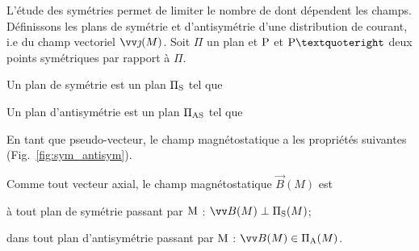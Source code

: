 \documentclass[12pt,fancy]{cours}
\begin{document}

 L'étude des symétries permet de limiter le nombre de  dont dépendent les champs. Définissons les plans de symétrie et d’antisymétrie d’une distribution de courant, i.e du champ vectoriel $\j(M)$.  Soit $\Pi$ un plan et $\rm P$ et $\rm P’$ deux points symétriques par rapport à $\Pi$.
\begin{liste}
  \item Un plan de symétrie est un plan $\Pi_{\rm S}$ tel que 
  \item Un plan d’antisymétrie est un plan $\Pi_{\rm AS}$ tel que

\end{liste}
 En tant que pseudo-vecteur, le champ magnétostatique a les propriétés suivantes (Fig.~\ref{fig:sym_antisym}).

\begin{prop}\label{prop:}
Comme tout vecteur axial, le champ magnétostatique $\Vec{B}(M)$ est 
 \begin{liste}
  \item {} à tout plan de symétrie passant par $\rm M$ : $\Vec{B}(M) \perp \Pi_{\rm S}(M)$;
  \item {} dans tout plan d'antisymétrie passant par $\rm M$ : $\Vec{B}(M) \in \Pi_{\rm A}(M)$.
 \end{liste}
\end{prop}

\end{document}
